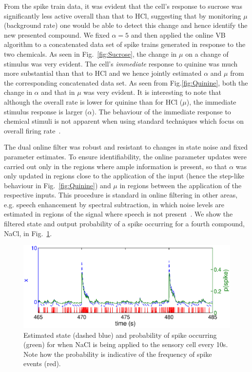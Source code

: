 \documentclass{article}
\begin{document}
From the spike train data, it was evident that the cell's response to sucrose was significantly less active overall than that to HCl, suggesting that by monitoring $\mu$ (background rate) one would be able to detect this change and hence identify the new presented compound. We fixed $\alpha = 5$ and then applied the online VB algorithm to a concatenated data set of spike trains generated in response to the two chemicals. As seen in Fig.~\ref{fig:Sucrose}, the change in $\mu$ on a change of stimulus was very evident. The cell's \emph{immediate} response to quinine was much more substantial than that to HCl and we hence jointly estimated $\alpha$ and $\mu$ from the corresponding concatenated data set. As seen from Fig.\ref{fig:Quinine}, both the change in $\alpha$ and that in $\mu$ was very evident. It is interesting to note that although the overall rate is lower for quinine than for HCl ($\mu$), the immediate stimulus response is larger ($\alpha$). The  behaviour of the immediate response to chemical stimuli is not apparent when using standard techniques which focus on overall firing rate~\cite{Lorenzo_2003}.

The dual online filter was robust and resistant to changes in state noise and fixed parameter
estimates. To ensure identifiability, the online parameter updates were carried out only in the
regions where ample information is present, so that $\alpha$ was only updated in regions close to
the application of the input (hence the step-like behaviour in Fig.~\ref{fig:Quinine}) and $\mu$ in regions between the
application of the respective inputs. This procedure is standard in online filtering in other areas,
e.g.  speech enhancement by spectral subtraction, in which noise levels are estimated in regions of the
signal where speech is not present~\cite{Boll_1979}. We show the filtered state and output probability of a spike occurring for a fourth compound, NaCl, in Fig.~\ref{fig:onlinestate}.

\begin{figure}[h] \begin{center}
 \includegraphics[width = 5in]{./Figures/taste_state.eps}  \caption{Estimated state (dashed blue) and
 probability of spike occurring (green) for when NaCl is being applied to the sensory cell every
 10s. Note how the probability is indicative of the frequency of spike events (red).}
 \label{fig:onlinestate} \end{center}

\end{figure}
\end{document}
